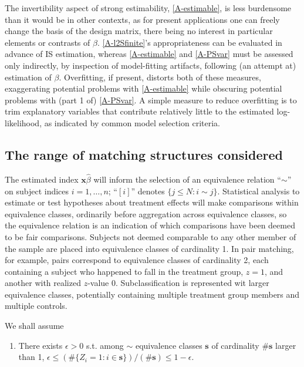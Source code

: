 \documentclass{article}
\newcounter{saveenumi}
\newcommand{\conti}{\setcounter{enumi}{\value{saveenumi}}}
\theoremstyle{remark}
\begin{document}
The invertibility aspect of strong estimability, \ref{A-estimable}, is less burdensome than it would be in other contexts, as for present applications one can freely change the basis of the design matrix, there being no interest in particular elements or contrasts of $\beta$.   
\ref{A-l2Sfinite}'s appropriateness can be evaluated in advance of IS estimation, whereas \ref{A-estimable} and \ref{A-PSvar} must be assessed only indirectly, by inspection of model-fitting artifacts, following (an attempt at) estimation of $\beta$.
Overfitting, if present, distorts both of these measures, exaggerating potential problems with \ref{A-estimable} while obscuring potential problems with (part 1 of) \ref{A-PSvar}.  A simple measure to reduce overfitting is to trim explanatory variables that contribute relatively little to the estimated log-likelihood, as indicated by common model selection criteria.

\subsection{The range of matching structures considered}

The estimated index $\mathbf{x}\hat\beta$ will inform the selection of an equivalence relation ``$\sim$'' on subject indices $i = 1, \ldots, n$; ``$[i]$'' denotes $\{j\leq N: i \sim j\}$. Statistical analysis to estimate or test hypotheses about treatment effects will make comparisons within equivalence classes, ordinarily before aggregation across equivalence classes, so the equivalence relation is an indication of which comparisons have been deemed to be fair comparisons.  Subjects not deemed comparable to any other member of the sample are placed into equivalence classes of cardinality 1.  In pair matching, for example, pairs correspond to equivalence classes of cardinality 2, each containing a subject who happened to fall in the treatment group, $z=1$, and another with realized  $z$-value 0. Subclassification is represented wit larger equivalence classes, potentially containing multiple treatment group members and multiple controls. 

We shall assume
\begin{enumerate} \conti
\item \label{A-bddedmatchratio} There exists $\epsilon>0$ s.t. among $\sim$ equivalence classes $\mathbf{s}$ of cardinality $\# \mathbf{s}$ larger than 1, $\epsilon \leq (\# \{Z_i=1: i\in \mathbf{s} \})/(\# \mathbf{s}) \leq 1-\epsilon$. 
\end{enumerate}
\end{document}
